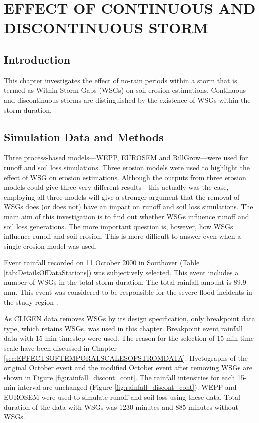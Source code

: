 \chapter{EFFECT OF CONTINUOUS AND DISCONTINUOUS STORM}
\label{sec:EFFECTSOFCONTINOUSANDDISCONTINUSSTORM}

\section{Introduction}
\label{sec:ContinousAndDiscontinousStormIntroduction}
This chapter investigates the effect of no-rain periods within a storm
that is termed as Within-Storm Gaps (WSGs) on soil erosion estimations.
Continuous and discontinuous storms are distinguished by the existence of WSGs
within the storm duration.


\section{Simulation Data and Methods}
\label{sec:ContinousAndDiscontinousStormMethods}

Three process-based models---WEPP, EUROSEM and RillGrow---were used for
runoff and soil loss simulations. Three erosion models were used to highlight
the effect of WSG on erosion estimations. Although the outputs from three
erosion models could give three very different results---this actually was the
case, employing all three models will give a stronger argument that the removal
of WSGs does (or does not) have an impact on runoff and soil loss simulations.
The main aim of this investigation is to find out whether WSGs influence runoff
and soil loss generations. The more important question is, however, how WSGs
influence runoff and soil erosion. This is more difficult to answer even when a
single erosion model was used.

Event rainfall recorded on 11 October 2000 in Southover (Table
\ref{tab:DetailsOfDataStations}) was subjectively selected. This event includes
a number of WSGs in the total storm duration. The total rainfall amount is 89.9
mm. This event was considered to be responsible for the severe flood incidents
in the study region \citep{boardman2001-346}.

As CLIGEN data removes WSGs by its design specification, only breakpoint data
type, which retains WSGs, was used in this chapter. Breakpoint event rainfall
data with 15-min timestep were used. The reason for the selection of 15-min time
scale have been discussed in Chapter
\ref{sec:EFFECTSOFTEMPORALSCALESOFSTROMDATA}. Hyetographs of the original
October event and the modified October event after removing WSGs are shown in
Figure \ref{fig:rainfall_discont_cont}. The rainfall intensities for each 15-min
interval are unchanged (Figure \ref{fig:rainfall_discont_cont}). WEPP and
EUROSEM were used to simulate runoff and soil loss using these data. Total
duration of the data with WSGs was 1230 minutes and 885 minutes without WSGs.

